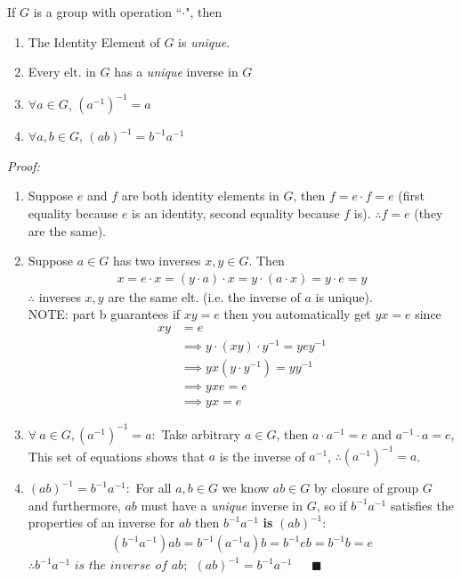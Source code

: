 \begin{lemma}
If $G$ is a group with operation ``$\cdot$", then
\begin{enumerate}[label=\alph*)]
    \item The Identity Element of $G$ is \textit{unique}.
    \item Every elt. in $G$ has a \textit{unique} inverse in $G$
    \item $\forall a \in G$, $(a^{-1})^{-1}=a$
    \item $\forall a,b \in G$, $(ab)^{-1}=b^{-1}a^{-1}$
\end{enumerate}
\textit{Proof:}
\begin{enumerate}[label=\alph*)]
    \item Suppose $e$ and $f$ are both identity elements in $G$, then $f=e\cdot f=e$ (first equality because $e$ is an identity, second equality because $f$ is). $\therefore f=e$ (they are the same).
    \item Suppose $a\in G$ has two inverses $x,y \in G$. Then
    \begin{align}
        x=e\cdot x=(y\cdot a)\cdot x = y\cdot(a\cdot x)=y\cdot e=y\nonumber
    \end{align}
    $\therefore $ inverses $x,y$ are the same elt. (i.e. the inverse of $a$ is unique).\\ 
    \noindent NOTE: part b guarantees if $xy=e$ then you automatically get $yx=e$ since
    \begin{align}
        xy&=e \nonumber \\
        &\implies y\cdot (xy)\cdot y^{-1} = yey^{-1} \nonumber \\
        &\implies yx(y\cdot y^{-1})= yy^{-1} \nonumber \\
        &\implies yxe=e \nonumber \\
        &\implies yx=e \nonumber
    \end{align}
    \item $\forall \ a \in G, (a^{-1})^{-1}=a:$ Take arbitrary $a\in G$, then $a\cdot a^{-1}=e$ and $a^{-1}\cdot a= e$, This set of equations shows that $a$ is the inverse of $a^{-1}$, $\therefore (a^{-1})^{-1}=a$.
    \item $(ab)^{-1}=b^{-1}a^{-1}:$ For all $a,b\in G$ we know $ab\in G$ by closure of group $G$ and furthermore, $ab$ must have a \textit{unique} inverse in $G$, so if $b^{-1}a^{-1}$ satisfies the properties of an inverse for $ab$ then $b^{-1}a^{-1}$ \textbf{is} $(ab)^{-1}$:
    \begin{align}
        (b^{-1}a^{-1})ab= b^{-1}(a^{-1}a)b=b^{-1}eb=b^{-1}b=e \nonumber
    \end{align}
    $\therefore b^{-1}a^{-1} \textit{ is the inverse of } ab; \ \ (ab)^{-1}=b^{-1}a^{-1} \ \ \ \ \ \ \ \blacksquare$
\end{enumerate}
\end{lemma}


